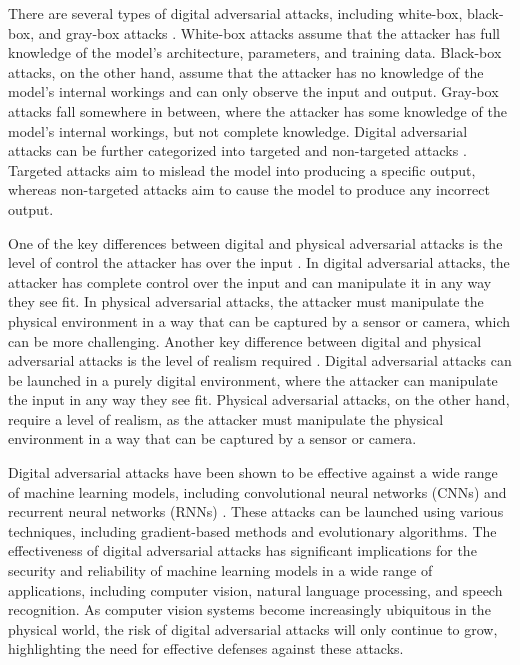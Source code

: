 \documentclass[11pt]{article}
\begin{document}
There are several types of digital adversarial attacks, including white-box, black-box, and gray-box attacks \cite{ref49}. White-box attacks assume that the attacker has full knowledge of the model's architecture, parameters, and training data. Black-box attacks, on the other hand, assume that the attacker has no knowledge of the model's internal workings and can only observe the input and output. Gray-box attacks fall somewhere in between, where the attacker has some knowledge of the model's internal workings, but not complete knowledge. Digital adversarial attacks can be further categorized into targeted and non-targeted attacks \cite{ref48}. Targeted attacks aim to mislead the model into producing a specific output, whereas non-targeted attacks aim to cause the model to produce any incorrect output.

One of the key differences between digital and physical adversarial attacks is the level of control the attacker has over the input \cite{ref34}. In digital adversarial attacks, the attacker has complete control over the input and can manipulate it in any way they see fit. In physical adversarial attacks, the attacker must manipulate the physical environment in a way that can be captured by a sensor or camera, which can be more challenging. Another key difference between digital and physical adversarial attacks is the level of realism required \cite{ref46}. Digital adversarial attacks can be launched in a purely digital environment, where the attacker can manipulate the input in any way they see fit. Physical adversarial attacks, on the other hand, require a level of realism, as the attacker must manipulate the physical environment in a way that can be captured by a sensor or camera.

Digital adversarial attacks have been shown to be effective against a wide range of machine learning models, including convolutional neural networks (CNNs) and recurrent neural networks (RNNs) \cite{ref50}. These attacks can be launched using various techniques, including gradient-based methods and evolutionary algorithms. The effectiveness of digital adversarial attacks has significant implications for the security and reliability of machine learning models in a wide range of applications, including computer vision, natural language processing, and speech recognition. As computer vision systems become increasingly ubiquitous in the physical world, the risk of digital adversarial attacks will only continue to grow, highlighting the need for effective defenses against these attacks.
\end{document}
